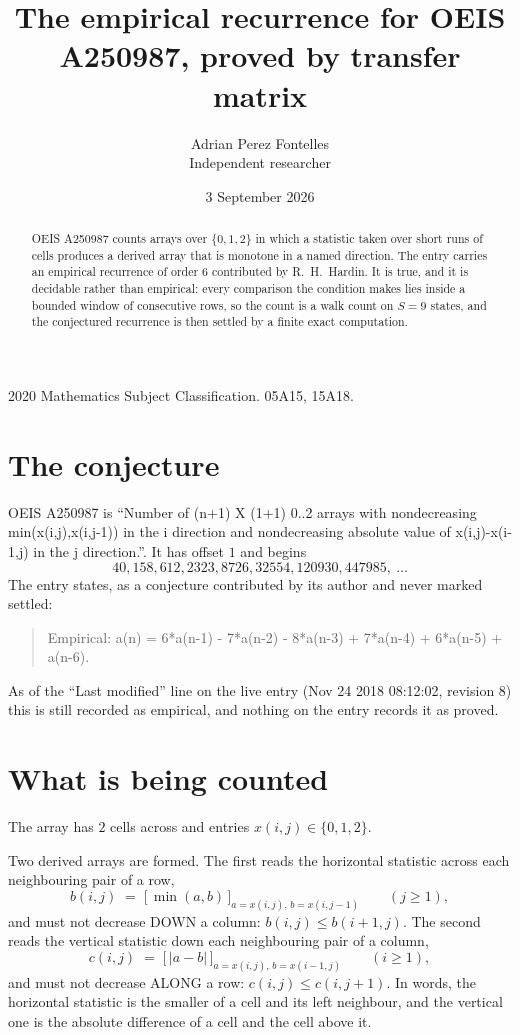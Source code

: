 \documentclass[11pt,a4paper]{article}
\title{The empirical recurrence for OEIS A250987, proved by transfer matrix}
\author{Adrian Perez Fontelles\\ \small Independent researcher}
\date{3 September 2026}
\theoremstyle{plain}
\theoremstyle{definition}
\begin{document}
\maketitle

\begin{abstract}
OEIS A250987 counts arrays over $\{0,1,2\}$ in which a statistic taken over short runs
of cells produces a derived array that is monotone in a named direction. The entry carries an
empirical recurrence of order $6$ contributed by R.~H.~Hardin. It is true, and it is
decidable rather than empirical: every comparison the condition makes lies inside a bounded
window of consecutive rows, so the count is a walk count on $S=9$ states, and the
conjectured recurrence is then settled by a finite exact computation.
\end{abstract}

\noindent\small 2020 Mathematics Subject Classification. 05A15, 15A18.\normalsize

\section{The conjecture}

OEIS A250987 is ``Number of (n+1) X (1+1) 0..2 arrays with nondecreasing min(x(i,j),x(i,j-1)) in the i direction and nondecreasing absolute value of x(i,j)-x(i-1,j) in the j direction.''. It has offset $1$ and begins
\[
40, 158, 612, 2323, 8726, 32554, 120930, 447985,\ \dots
\]
The entry states, as a conjecture contributed by its author and never marked settled:
\begin{quote}
Empirical: a(n) = 6*a(n-1) - 7*a(n-2) - 8*a(n-3) + 7*a(n-4) + 6*a(n-5) + a(n-6).
\end{quote}
As of the ``Last modified'' line on the live entry (Nov 24 2018 08:12:02, revision 8) this is still
recorded as empirical, and nothing on the entry records it as proved.

\section{What is being counted}

The array has $2$ cells across and entries $x(i,j)\in\{0,1,2\}$.

Two derived arrays are formed. The first reads the horizontal statistic across each
neighbouring pair of a row,
\[
b(i,j)\;=\;\bigl[\,\min(a,b)\,\bigr]_{a=x(i,j),\,b=x(i,j-1)}\qquad (j\ge1),
\]
and must not decrease DOWN a column: $b(i,j)\le b(i{+}1,j)$. The second reads the vertical
statistic down each neighbouring pair of a column,
\[
c(i,j)\;=\;\bigl[\,\lvert a-b\rvert\,\bigr]_{a=x(i,j),\,b=x(i{-}1,j)}\qquad (i\ge1),
\]
and must not decrease ALONG a row: $c(i,j)\le c(i,j{+}1)$. In words, the horizontal statistic
is the smaller of a cell and its left neighbour, and the vertical one is
the absolute difference of a cell and the cell above it.
\end{document}
